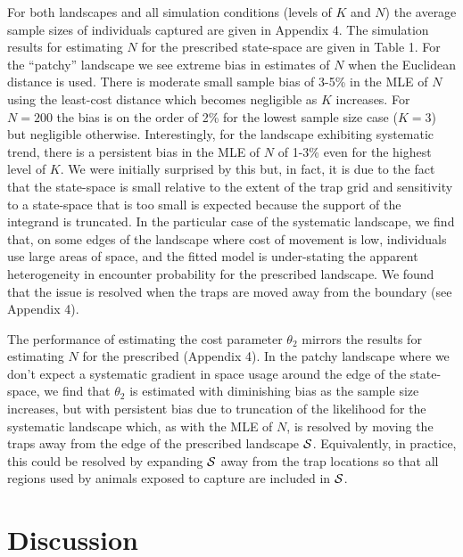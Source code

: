 \documentclass[12pt]{article}
\begin{document}
\begin{spacing}{1.8}
For both landscapes and all simulation conditions (levels of $K$ and
$N$) the average sample sizes of individuals captured are given in
Appendix 4.  The simulation results for estimating $N$
for the prescribed state-space are given in Table 1.
For the ``patchy'' landscape we see
extreme 
bias in estimates of $N$ when the Euclidean distance is used. There is
moderate small sample bias of 3-5\% in the MLE of $N$ using the
least-cost distance which becomes negligible as $K$ increases. For
$N=200$ the bias is on the order of 2\% for the lowest sample size
case ($K=3$) but negligible otherwise.  Interestingly, for the
landscape exhibiting systematic trend, there is a persistent bias
in the MLE of $N$ of 1-3\% even for the highest level of $K$. We were
initially surprised by this but, in fact, it is due to the fact that
the state-space is small relative to the extent of the trap grid and
sensitivity to a state-space that is too small is expected because the
support of the integrand is truncated. In the particular case of the
systematic landscape, we find that, on some edges of the landscape
where cost of movement is low, individuals use large areas of space,
and the fitted model is under-stating the apparent
heterogeneity in encounter probability for the prescribed landscape.  We
found that the issue is resolved when the traps are moved away from
the boundary (see Appendix 4).

The performance of estimating the cost parameter $\theta_{2}$ mirrors
the results for estimating $N$ for the prescribed 
(Appendix 4). In the
patchy landscape where we don't expect a systematic gradient in space
usage around the edge of the state-space, we find 
that $\theta_{2}$ is estimated with
diminishing bias as the sample size increases, but with persistent
bias due to truncation of the likelihood for the systematic
landscape which, as with the MLE of $N$, is resolved by moving the
traps away from the edge of the prescribed landscape ${\cal S}$. Equivalently, in practice,
this could be resolved by expanding ${\cal S}$ away from the trap
locations so that all regions used by animals exposed to capture are
included in ${\cal S}$.



\section{Discussion}


\end{spacing}
\end{document}
